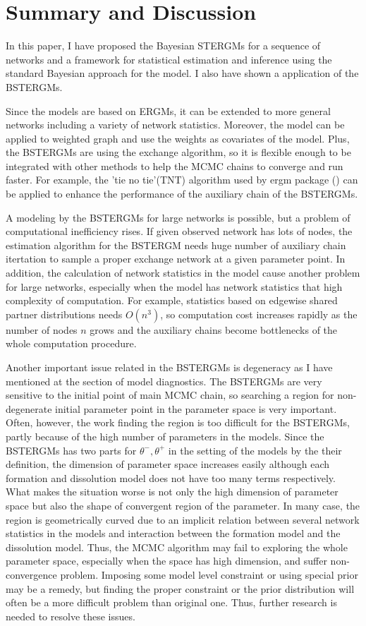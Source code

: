 \documentclass[aspectratio=169,ignorenonframetext,9pt]{beamer}
\theoremstyle{plain}
\theoremstyle{definition}
\begin{document}

\section{Summary and Discussion}
In this paper, I have proposed the Bayesian STERGMs for a sequence of networks
and a framework for statistical estimation and inference using the standard Bayesian approach for the model.
I also have shown a application of the BSTERGMs. %

Since the models are based on ERGMs, it can be extended to more general networks
including a variety of network statistics.
Moreover, the model can be applied to weighted graph and use the weights as covariates of the model.
Plus, the BSTERGMs are using the exchange algorithm, so it is flexible enough to be integrated
with other methods to help the MCMC chains to converge and run faster.
For example, the 'tie no tie'(TNT) algorithm used by ergm package (\cite{RN100}) can be applied to
enhance the performance of the auxiliary chain of the BSTERGMs.

A modeling by the BSTERGMs for large networks is possible,
but a problem of computational inefficiency rises.
If given observed network has lots of nodes, the estimation algorithm for the BSTERGM needs 
huge number of auxiliary chain itertation to sample a proper exchange network at a given parameter point.
In addition, the calculation of network statistics in the model cause another problem for large networks,
especially when the model has network statistics that high complexity of computation.
For example, statistics based on edgewise shared partner distributions needs $O(n^3)$,
so computation cost increases rapidly as the number of nodes $n$ grows and
the auxiliary chains become bottlenecks of the whole computation procedure.

Another important issue related in the BSTERGMs is degeneracy as I have mentioned at the section of model diagnostics.
The BSTERGMs are very sensitive to the initial point of main MCMC chain, so
searching a region for non-degenerate initial parameter point in the parameter space is very important.
Often, however, the work finding the region is too difficult for the BSTERGMs,
partly because of the high number of parameters in the models.
Since the BSTERGMs has two parts for $\theta^-, \theta^+$ in the setting of the models by the their definition,
the dimension of parameter space increases easily although each formation and dissolution model does not have
too many terms respectively.
What makes the situation worse is not only the high dimension of parameter space but also the shape of convergent region of the parameter.
In many case, the region is geometrically curved due to an implicit relation between several network statistics in the models
and interaction between the formation model and the dissolution model.
Thus, the MCMC algorithm may fail to exploring the whole parameter space, especially when the space has high dimension,
and suffer non-convergence problem.
Imposing some model level constraint or using special prior may be a remedy,
but finding the proper constraint or the prior distribution will often be a more difficult problem than original one.
Thus, further research is needed to resolve these issues.
\end{document}
